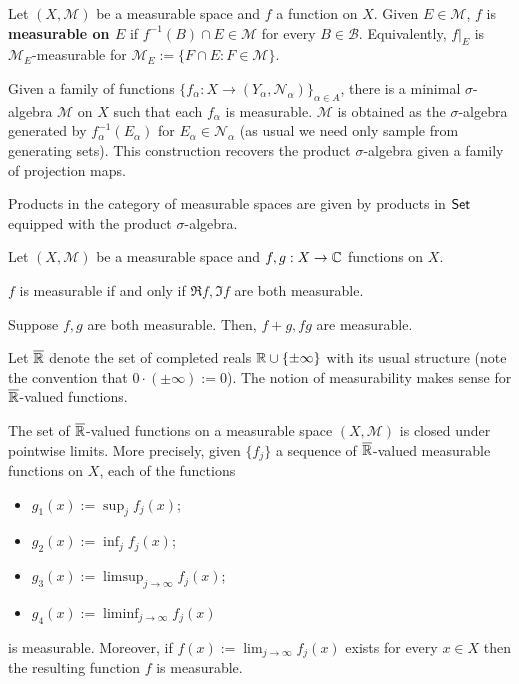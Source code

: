 \documentclass[11pt]{article}
\newcommand{\B}{\mathcal{B}}
\newcommand{\M}{\mathcal{M}}
\renewcommand{\N}{\mathcal{N}}
\newcommand{\llim}{\displaystyle\lim}
\newcommand{\lliminf}{\displaystyle\liminf}
\newcommand{\llimsup}{\displaystyle\limsup}
\begin{document}
\begin{definition}
Let $(X,\M)$ be a measurable space and $f$ a function on $X$. Given $E\in\M$, $f$ is \textbf{measurable on $E$} if $f^{-1}(B)\cap E\in\M$ for every $B\in\B$. Equivalently, $f|_E$ is $\M_E$-measurable for $\M_E:=\{F\cap E : F\in\M\}$.
\end{definition}

Given a family of functions $\{f_{\alpha}: X\to(Y_{\alpha},\N_{\alpha})\}_{\alpha\in A}$, there is a minimal $\sigma$-algebra $\M$ on $X$ such that each $f_{\alpha}$ is measurable. $\M$ is obtained as the $\sigma$-algebra generated by $f_{\alpha}^{-1}(E_{\alpha})$ for $E_{\alpha}\in\N_{\alpha}$ (as usual we need only sample from generating sets). This construction recovers the product $\sigma$-algebra given a family of projection maps.

\begin{proposition}
Products in the category of measurable spaces are given by products in $\operatorname{\mathsf{Set}}$ equipped with the product $\sigma$-algebra.
\end{proposition}

\begin{proposition}
Let $(X,\M)$ be a measurable space and $f,g: X\to\mathbb{C}$ functions on $X$.
\begin{enum}{\alph}
\item $f$ is measurable if and only if $\Re f,\Im f$ are both measurable.
\item Suppose $f,g$ are both measurable. Then, $f+g,fg$ are measurable.
\end{enum}
\end{proposition}

Let $\overline{\mathbb{R}}$ denote the set of completed reals $\mathbb{R}\cup\{\pm\infty\}$ with its usual structure (note the convention that $0\cdot(\pm\infty):=0$). The notion of measurability makes sense for $\overline{\mathbb{R}}$-valued functions.

\begin{proposition}
The set of $\overline{\mathbb{R}}$-valued functions on a measurable space $(X,\M)$ is closed under pointwise limits. More precisely, given $\{f_j\}$ a sequence of $\overline{\mathbb{R}}$-valued measurable functions on $X$, each of the functions
\begin{itemize}
\item $g_1(x):=\sup_jf_j(x)$;
\item $g_2(x):=\inf_jf_j(x)$;
\item $g_3(x):=\llimsup_{j\to\infty}f_j(x)$;
\item $g_4(x):=\lliminf_{j\to\infty}f_j(x)$
\end{itemize}
is measurable. Moreover, if $f(x):=\llim_{j\to\infty}f_j(x)$ exists for every $x\in X$ then the resulting function $f$ is measurable.
\end{proposition}
\end{document}
